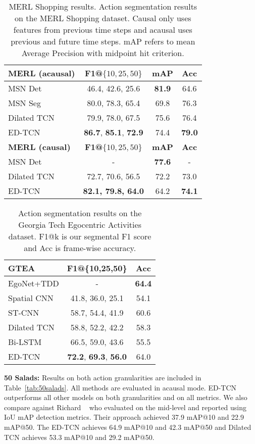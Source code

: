 \documentclass[10pt,twocolumn,letterpaper]{article}
\newcommand{\fakesubsection}[1]{\smallskip\noindent\textbf{#1:}}
\begin{document}
\begin{table}
\centering 
\begin{tabular}{| l | c  | c | c |}
\hline
\textbf{MERL (acausal)} &  \textbf{F1@$\{10,25,50\}$} & \textbf{mAP} & \textbf{Acc} \\
\hline
MSN Det \cite{singh_cvpr_2016_merl}  & 46.4,  42.6, 25.6  & \textbf{81.9} & 64.6 \\
MSN Seg \cite{singh_cvpr_2016_merl} &  80.0, 78.3, 65.4 & 69.8& 76.3 \\
Dilated TCN & 79.9, 78.0, 67.5& 75.6 & 76.4  \\
ED-TCN &  \textbf{86.7}, \textbf{85.1}, \textbf{72.9}& 74.4 & \textbf{79.0}    \\      
\hline
\textbf{MERL (causal)} &  \textbf{F1@$\{10,25,50\}$} & \textbf{mAP} & \textbf{Acc} \\
\hline
MSN Det  \cite{singh_cvpr_2016_merl} & - & \textbf{77.6} & -  \\ 
Dilated TCN  & 72.7, 70.6, 56.5 & 72.2 & 73.0  \\
ED-TCN  & \textbf{82.1, 79.8, 64.0}  & 64.2 & \textbf{74.1}\\
\hline
\end{tabular}
\label{tab:MERL}
\caption{MERL Shopping results. 
Action segmentation results on the MERL Shopping dataset. Causal only uses features from previous time steps and acausal uses previous and future time steps. mAP refers to mean Average Precision with midpoint hit criterion.
}
\end{table}

\begin{table}
\centering
\begin{tabular}{| l | c | c  |}
\hline
\textbf{GTEA} & \textbf{F1@\{10,25,50\}}   & \textbf{Acc} \\
\hline
EgoNet+TDD \cite{singh_cvpr_2016_ego}& - &  \textbf{64.4} \\
Spatial CNN~\cite{lea_eccv_2016}  & 41.8, 36.0, 25.1  &   54.1 \\
ST-CNN~\cite{lea_eccv_2016}  & 58.7, 54.4, 41.9 &  60.6 \\ 
Dilated TCN  & 58.8, 52.2, 42.2 &  58.3 \\ 
Bi-LSTM  & 66.5, 59.0, 43.6 &  55.5 \\ 
ED-TCN & \textbf{72.2}, \textbf{69.3}, \textbf{56.0} & 64.0  \\
\hline
\end{tabular}      
\label{tab:gtea}
\caption{Action segmentation results on the Georgia Tech Egocentric Activities dataset. F1@k is our segmental F1 score and Acc is frame-wise accuracy. 
}
\end{table}
\fakesubsection{50 Salads}
Results on both action granularities are included in Table~\ref{tab:50salads}. All methods are evaluated in acausal mode. 
ED-TCN outperforms all other models on both granularities and on all metrics. 
We also compare against Richard \etal~\cite{richard_cvpr_2016} who evaluated on the mid-level and reported using IoU mAP detection metrics. Their approach achieved 37.9 mAP@10 and 22.9 mAP@50. The ED-TCN achieves 64.9 mAP@10 and 42.3 mAP@50 and Dilated TCN achieves 53.3 mAP@10 and 29.2 mAP@50. 
\end{document}
